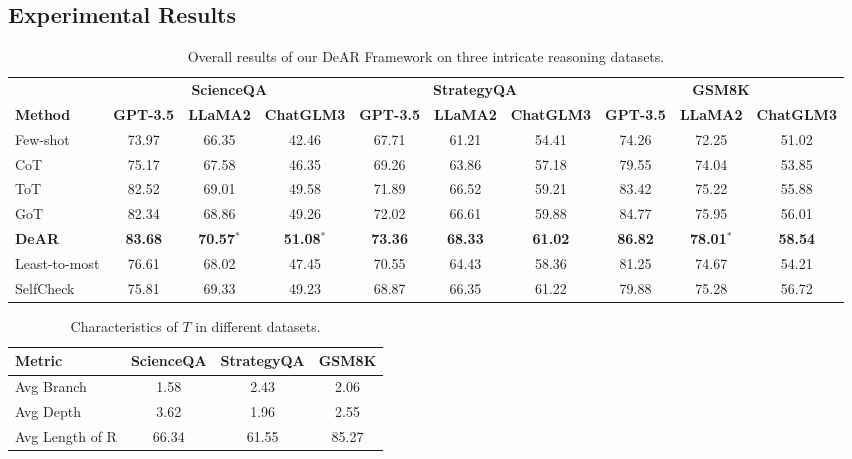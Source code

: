 \documentclass{article}
\begin{document}
\subsection{Experimental Results}
\begin{table}[H]
\centering
\caption{Overall results of our DeAR Framework on three intricate reasoning datasets.}
\vspace{2mm}
\small
\begin{tabular}{lccccccccc}
\toprule
& \multicolumn{3}{c}{\textbf{ScienceQA}} & \multicolumn{3}{c}{\textbf{StrategyQA}} & \multicolumn{3}{c}{\textbf{GSM8K}} \\
\cmidrule(lr){2-4} \cmidrule(lr){5-7} \cmidrule(lr){8-10}
\textbf{Method} & \textbf{GPT-3.5} & \textbf{LLaMA2} & \textbf{ChatGLM3} & \textbf{GPT-3.5} & \textbf{LLaMA2} & \textbf{ChatGLM3} & \textbf{GPT-3.5} & \textbf{LLaMA2} & \textbf{ChatGLM3} \\
\midrule
Few-shot & 73.97 & 66.35 & 42.46 & 67.71 & 61.21 & 54.41 & 74.26 & 72.25 & 51.02 \\
CoT & 75.17 & 67.58 & 46.35 & 69.26 & 63.86 & 57.18 & 79.55 & 74.04 & 53.85 \\
ToT & 82.52 & 69.01 & 49.58 & 71.89 & 66.52 & 59.21 & 83.42 & 75.22 & 55.88 \\
GoT & 82.34 & 68.86 & 49.26 & 72.02 & 66.61 & 59.88 & 84.77 & 75.95 & 56.01 \\
\textbf{DeAR} & \textbf{83.68} & \textbf{70.57}$^*$ & \textbf{51.08}$^*$ & \textbf{73.36} & \textbf{68.33} & \textbf{61.02} & \textbf{86.82} & \textbf{78.01}$^*$ & \textbf{58.54} \\
\midrule
Least-to-most & 76.61 & 68.02 & 47.45 & 70.55 & 64.43 & 58.36 & 81.25 & 74.67 & 54.21 \\
SelfCheck & 75.81 & 69.33 & 49.23 & 68.87 & 66.35 & 61.22 & 79.88 & 75.28 & 56.72 \\
\bottomrule
\end{tabular}
\end{table}

\begin{table}[H]
\centering
\caption{Characteristics of $T$ in different datasets.}
\vspace{2mm}
\begin{tabular}{lccc}
\toprule
\textbf{Metric} & \textbf{ScienceQA} & \textbf{StrategyQA} & \textbf{GSM8K} \\
\midrule
Avg Branch & 1.58 & 2.43 & 2.06 \\
Avg Depth & 3.62 & 1.96 & 2.55 \\
Avg Length of R & 66.34 & 61.55 & 85.27 \\
\bottomrule
\end{tabular}
\end{table}
\end{document}
